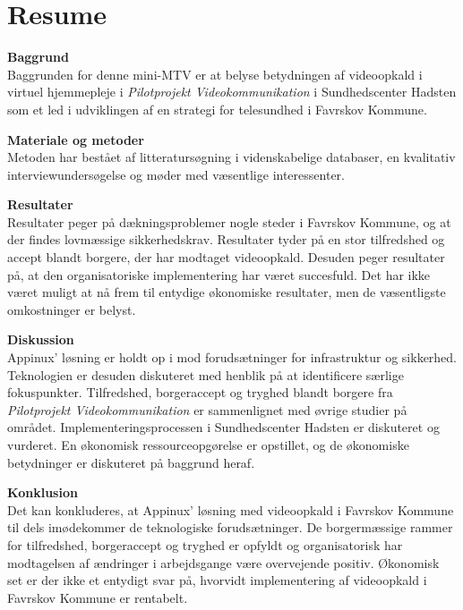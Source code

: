 \chapter{Resume}

\textbf{Baggrund}\\
Baggrunden for denne mini-MTV er at belyse betydningen af videoopkald i virtuel hjemmepleje i \textit{Pilotprojekt Videokommunikation} i Sundhedscenter Hadsten som et led i udviklingen af en strategi for telesundhed i Favrskov Kommune.

\textbf{Materiale og metoder}\\
Metoden har bestået af litteratursøgning i videnskabelige databaser, en kvalitativ interviewundersøgelse og møder med væsentlige interessenter.
 
\textbf{Resultater}\\
Resultater peger på dækningsproblemer nogle steder i Favrskov Kommune, og at der findes lovmæssige sikkerhedskrav. Resultater tyder på en stor tilfredshed og accept blandt borgere, der har modtaget videoopkald. Desuden peger resultater på, at den organisatoriske implementering har været succesfuld. Det har ikke været muligt at nå frem til entydige økonomiske resultater, men de væsentligste omkostninger er belyst. 

\textbf{Diskussion}\\
Appinux’ løsning er holdt op i mod forudsætninger for infrastruktur og sikkerhed. Teknologien er desuden diskuteret med henblik på at identificere særlige fokuspunkter. Tilfredshed, borgeraccept og tryghed blandt borgere fra \textit{Pilotprojekt Videokommunikation} er sammenlignet med øvrige studier på området. Implementeringsprocessen i Sundhedscenter Hadsten er diskuteret og vurderet. En økonomisk ressourceopgørelse er opstillet, og de økonomiske betydninger er diskuteret på baggrund heraf.

\textbf{Konklusion}\\
Det kan konkluderes, at Appinux’ løsning med videoopkald i Favrskov Kommune til dels imødekommer de teknologiske forudsætninger. De borgermæssige rammer for tilfredshed, borgeraccept og tryghed er opfyldt og organisatorisk har modtagelsen af ændringer i arbejdsgange være overvejende positiv. Økonomisk set er der ikke et entydigt svar på, hvorvidt implementering af videoopkald i Favrskov Kommune er rentabelt.